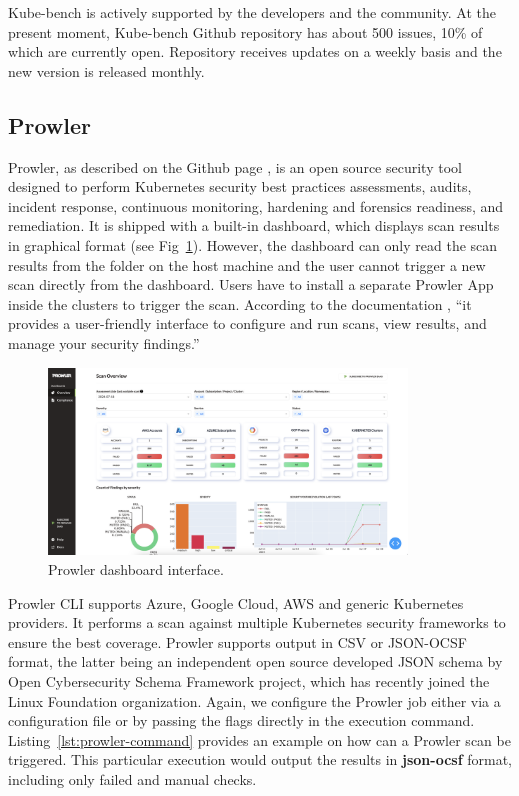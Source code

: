 Kube-bench is actively supported by the developers and the community. At the present moment, Kube-bench Github repository has about 500 issues, 10\% of which are currently open. Repository receives updates on a weekly basis and the new version is released monthly.

\subsection{Prowler}

Prowler, as described on the Github page \cite{prowler-github}, is an open source security tool designed to perform Kubernetes security best practices assessments, audits, incident response, continuous monitoring, hardening and forensics readiness, and remediation. It is shipped with a built-in dashboard, which displays scan results in graphical format (see Fig~\ref{img:prowler-dashboard}). However, the dashboard can only read the scan results from the folder on the host machine and the user cannot trigger a new scan directly from the dashboard. Users have to install a separate Prowler App inside the clusters to trigger the scan. According to the documentation \cite{prowler-app-page}, ``it provides a user-friendly interface to configure and run scans, view results, and manage your security findings.''

\begin{figure}[!hbt]
	\begin{center}
		\includegraphics[width=0.85\textwidth]{images/prowler-dashboard.png}
        \caption{Prowler dashboard interface.}
		\label{img:prowler-dashboard}
	\end{center}
\end{figure}

Prowler CLI supports Azure, Google Cloud, AWS and generic Kubernetes providers. It performs a scan against multiple Kubernetes security frameworks to ensure the best coverage. Prowler supports output in CSV or JSON-OCSF format, the latter being an independent open source developed JSON schema by Open Cybersecurity Schema Framework project, which has recently joined the Linux Foundation organization. Again, we configure the Prowler job either via a configuration file or by passing the flags directly in the execution command. Listing~\ref{lst:prowler-command} provides an example on how can a Prowler scan be triggered. This particular execution would output the results in \textbf{json-ocsf} format, including only failed and manual checks.

